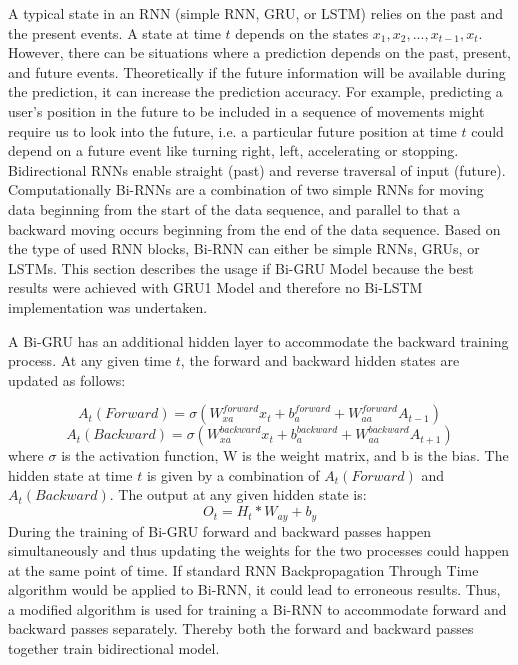 A typical state in an RNN (simple RNN, GRU, or LSTM) relies on the past and the present events. A state at time $t$ depends on the states $x_1, x_2,..., x_{t-1}, x_t$. However, there can be situations where a prediction depends on the past, present, and future events. Theoretically if the future information will be available during the prediction, it can increase the prediction accuracy. For example, predicting a user's position in the future to be included in a sequence of movements might require us to look into the future, i.e. a particular future position at time $t$ could depend on a future event like turning right, left, accelerating or stopping. Bidirectional RNNs enable straight (past) and reverse traversal of input (future). Computationally Bi-RNNs are a combination of two simple RNNs for moving data beginning from the start of the data sequence, and parallel to that a backward moving occurs beginning from the end of the data sequence. Based on the type of used RNN blocks, Bi-RNN can either be simple RNNs, GRUs, or LSTMs. This section describes the usage if Bi-GRU Model because the best results were achieved with GRU1 Model and therefore no Bi-LSTM implementation was undertaken.

A Bi-GRU has an additional hidden layer to accommodate the backward training process. At any given time $t$, the forward and backward hidden states are updated as follows:

\begin{equation}
A_t(Forward) = \sigma (W_{xa}^{forward}x_t + b_{a}^{forward} + W_{aa}^{forward}A_{t-1})
\end{equation}
\begin{equation}
A_t(Backward) = \sigma (W_{xa}^{backward}x_t + b_{a}^{backward} + W_{aa}^{backward}A_{t+1})
\end{equation}
where 
$\sigma$ is the activation function, W is the weight matrix, and b is the bias. The hidden state at time $t$ is given by a combination of $A_t(Forward)$ and $A_t(Backward)$. The output at any given hidden state is:
\begin{equation}
O_t = H_t * W_{ay} + b_y
\end{equation}
During the training of Bi-GRU forward and backward passes happen simultaneously and thus updating the weights for the two processes could happen at the same point of time. If standard RNN Backpropagation Through Time algorithm would be applied to Bi-RNN, it could lead to erroneous results. Thus, a modified algorithm is used for training a Bi-RNN to accommodate forward and backward passes separately. Thereby both the forward and backward passes together train bidirectional model. 

